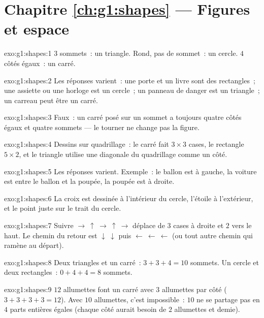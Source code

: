 \section*{Chapitre \ref{ch:g1:shapes} --- Figures et espace}

\begin{solution}{exo:g1:shapes:1}
$3$ sommets~: un triangle. Rond, pas de sommet~: un cercle. $4$
côtés égaux~: un carré.
\end{solution}

\begin{solution}{exo:g1:shapes:2}
Les réponses varient~: une porte et un livre sont des rectangles~;
une assiette ou une horloge est un cercle~; un panneau de danger est
un triangle~; un carreau peut être un carré.
\end{solution}

\begin{solution}{exo:g1:shapes:3}
Faux~: un carré posé sur un sommet a toujours quatre côtés
égaux et quatre sommets --- le tourner ne change pas la figure.
\end{solution}

\begin{solution}{exo:g1:shapes:4}
Dessins sur quadrillage~: le carré fait $3 \times 3$ cases, le
rectangle $5 \times 2$, et le triangle utilise une diagonale du
quadrillage comme un côté.
\end{solution}

\begin{solution}{exo:g1:shapes:5}
Les réponses varient. Exemple~: le ballon est à gauche, la
voiture est entre le ballon et la poupée, la poupée est à
droite.
\end{solution}

\begin{solution}{exo:g1:shapes:6}
La croix est dessinée à l'intérieur du cercle, l'étoile à
l'extérieur, et le point juste sur le trait du cercle.
\end{solution}

\begin{solution}{exo:g1:shapes:7}
Suivre $\to\ \uparrow\ \to\ \uparrow\ \to$ déplace de $3$ cases
à droite et $2$ vers le haut. Le chemin du retour est
$\downarrow\ \downarrow$ puis $\leftarrow\ \leftarrow\ \leftarrow$
(ou tout autre chemin qui ramène au départ).
\end{solution}

\begin{solution}{exo:g1:shapes:8}
Deux triangles et un carré~: $3 + 3 + 4 = 10$ sommets. Un cercle
et deux rectangles~: $0 + 4 + 4 = 8$ sommets.
\end{solution}

\begin{solution}{exo:g1:shapes:9}
$12$ allumettes font un carré avec $3$ allumettes par côté
($3 + 3 + 3 + 3 = 12$). Avec $10$ allumettes, c'est impossible~:
$10$ ne se partage pas en $4$ parts entières égales (chaque
côté aurait besoin de $2$ allumettes et demie).
\end{solution}
